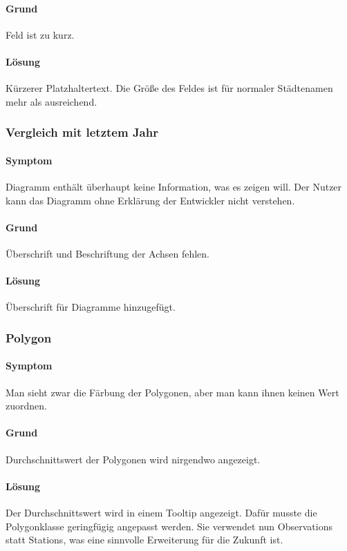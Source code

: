 \paragraph{Grund}
Feld  ist zu kurz.

\paragraph{Lösung}
Kürzerer Platzhaltertext. Die Größe des Feldes ist für normaler Städtenamen mehr als ausreichend.

\subsubsection{Vergleich mit letztem Jahr}
\paragraph{Symptom}

Diagramm enthält überhaupt keine Information, was es zeigen will. Der Nutzer kann das Diagramm ohne Erklärung der Entwickler nicht verstehen.


\paragraph{Grund}
Überschrift und Beschriftung der Achsen fehlen.

\paragraph{Lösung}
Überschrift für Diagramme hinzugefügt.

\subsubsection{Polygon}
\paragraph{Symptom}

Man sieht zwar die Färbung der Polygonen, aber man kann ihnen keinen Wert zuordnen.


\paragraph{Grund}
Durchschnittswert der Polygonen wird nirgendwo angezeigt.

\paragraph{Lösung}
Der Durchschnittswert wird in einem Tooltip angezeigt. Dafür musste die Polygonklasse geringfügig
angepasst werden. Sie verwendet nun Observations statt Stations, was eine sinnvolle Erweiterung für die Zukunft ist.


